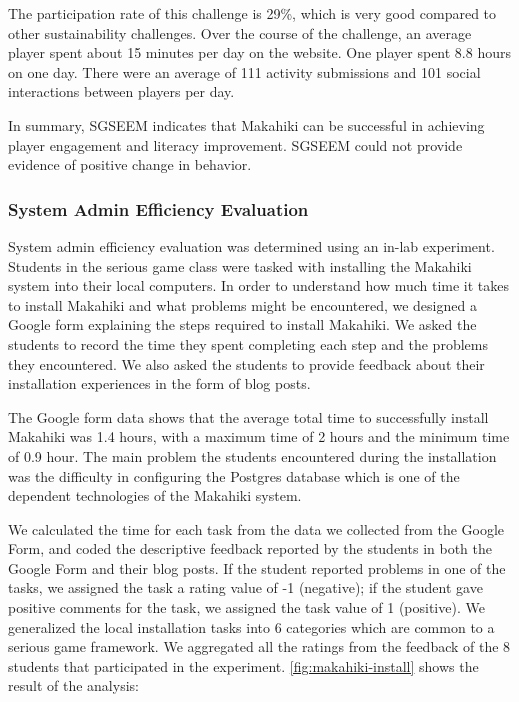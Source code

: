 \documentclass{sigchi}
\begin{document}
The participation rate of this challenge is 29\%, which is very good compared to other
sustainability challenges. Over the course of the challenge, an average player spent about
15 minutes per day on the website. One player spent 8.8 hours on one day. There were an
average of 111 activity submissions and 101 social interactions between players per day.

In summary, SGSEEM indicates that Makahiki can be successful in achieving
player engagement and literacy improvement. SGSEEM could not provide evidence of positive change in
behavior. 


\subsubsection{System Admin Efficiency Evaluation}

System admin efficiency evaluation was determined using an in-lab experiment.  Students in
the serious game class were tasked with installing the Makahiki system into their local
computers. In order to understand how much time it takes to install Makahiki and what
problems might be encountered, we designed a Google form explaining the steps required to
install Makahiki. We asked the students to record the time they spent completing each step
and the problems they encountered. We also asked the students to provide feedback about
their installation experiences in the form of blog posts.

The Google form data shows that the average total time to successfully install Makahiki
was 1.4 hours, with a maximum time of 2 hours and the minimum time of 0.9 hour. The main
problem the students encountered during the installation was the difficulty in configuring
the Postgres database which is one of the dependent technologies of the Makahiki system.

We calculated the time for each task from the data we collected from the Google
Form, and coded the descriptive feedback reported by the students in both the Google Form and
 their blog posts. If the student reported problems in one of the tasks, we assigned the task
  a rating value of -1 (negative); if the student gave positive comments for the task, we
  assigned the task value of 1 (positive). We generalized the local installation tasks into 6
  categories which are common to a serious game framework. We aggregated all the ratings from
  the feedback of the 8 students that participated in the experiment.
  \autoref{fig:makahiki-install} shows the result of the analysis:
\end{document}
